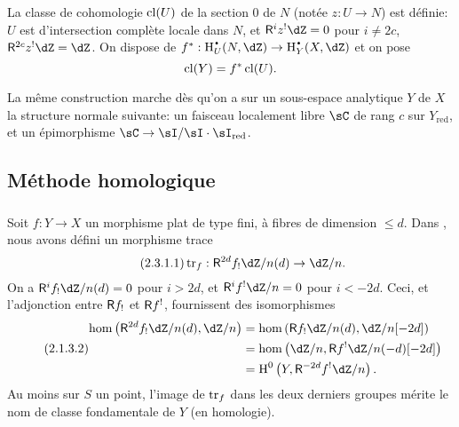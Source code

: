La classe de cohomologie $\operatorname{cl}(U)$ de la section $0$ de $N$ (notée $z:U\to N$) 
est définie: $U$ est d'intersection complète locale dans $N$, et 
$\R^i z^!\dZ = 0$ pour $i\ne 2 c$, $\R^{2 c} z^!\dZ = \dZ$. On dispose de 
$f^*:\h_U^\bullet(N,\dZ) \to \h_Y^\bullet(X,\dZ)$ et on pose 
\[
  \operatorname{cl}(Y) = f^*\operatorname{cl}(U) \text{.}
\]

La même construction marche dès qu'on a sur un sous-espace analytique $Y$ 
de $X$ la structure normale suivante: un faisceau localement libre $\sC$ de 
rang $c$ sur $Y_\text{red}$, et un épimorphisme 
$\sC\to \sI/\sI\cdot \sI_\text{red}$. 










\subsection{Méthode homologique}\label{IV:2-3}





\subsubsection{}\label{IV:2-3-1}

Soit $f:Y\to X$ un morphisme plat de type fini, à fibres de dimension 
$\leqslant d$. Dans \cite[XVIII 2.9]{sga4}, nous avons défini un morphisme 
trace 
\begin{equation*}\tag{2.3.1.1}\label{IV:eq:2-3-1-1}
  \tr_f:\R^{2 d} f_! \dZ/n(d) \to \dZ/n \text{.}
\end{equation*}
On a $\R^i f_!\dZ/n(d)=0$ pour $i>2 d$, et $\R^i f^!\dZ/n=0$ pour $i<-2 d$. 
Ceci, et l'adjonction entre $\mathsf{R} f_!$ et $\mathsf{R} f^!$, fournissent des isomorphismes 
\begin{equation*}\tag{2.1.3.2}\label{IV:eq:2-1-3-2}
\begin{aligned}
  \hom\left(\R^{2 d}f_!\dZ/n(d),\dZ/n\right) 
    &= \hom\left(\R f_!\dZ/n(d),\dZ/n[-2 d]\right) \\
    &= \hom\left(\dZ/n,\R f^!\dZ/n(-d)[-2 d]\right) \\
    &= \h^0\left(Y,\R^{-2 d}f^!\dZ/n\right) \text{.}
\end{aligned}
\end{equation*}
Au moins sur $S$ un point, l'image de $\operatorname{tr}_f$ dans les deux derniers groupes 
mérite le nom de classe fondamentale de $Y$ (en homologie). 

